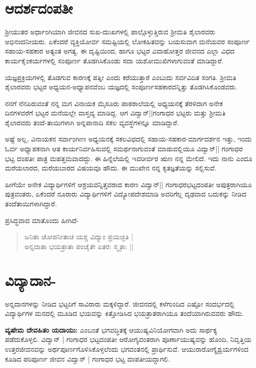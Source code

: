 \section*{ಆದರ್ಶದಂಪತೀ}

ಶ್ರೀಯುತರ ಅರ್ಧಾಂಗಿಯಾಗಿ ಜೀವನದ ಸುಖ-ದುಃಖಗಳಲ್ಲಿ ಪಾಲ್ಗೊಳ್ಳುತ್ತಿರುವ ಶ್ರೀಮತಿ ಶೈಲಾರವರು ಅಭಿನಂದನೀಯರು. ಏಕೆಂದರೆ ವ್ಯಕ್ತಿಯೋರ್ವ ಸಮಷ್ಟಿಯಲ್ಲಿ ಲೋಕಹಿತವನ್ನು ಬಯಸುವಾಗ ಮನೆಯವರ ಸಂಪೂರ್ಣ ಸಹಾಯ-ಸಹಕಾರ ಅತ್ಯಂತ ಅಗತ್ಯ. ಈ ದೃಷ್ಟಿಯಿಂದ, ಹಾಗೂ ಭಟ್ಟರ ವಿವಾಹೋತ್ತರ ಜೀವನದ ಎಲ್ಲಾ ವಿಧದ ಕಾರ್ಯಕೈಂಕರ್ಯಗಳಲ್ಲಿ ಸಂಪೂರ್ಣ ತೊಡಗಿಸಿಕೊಂಡು ಸದಾ ಯಶೋಮುಖಿಗಳಾಗುವಂತೆ ಮಾಡಿದ್ದಾರೆ. 

ಯಜ್ಞಪ್ರಕ್ರಿಯಗಳಲ್ಲಿ ತೊಡಗುವ ಕಾರಣಕ್ಕೆ ಪತ್ನೀ ಎಂದು ಕರೆಯುತ್ತಾರೆ ಎಂಬುದು ಸರ್ವವಿದಿತ ಸಂಗತಿ. ಶ್ರೀಮತಿ ಶೈಲಾರವರು ಭಟ್ಟರ ಅಧ್ಯಯನ-ಅಧ್ಯಾಪನವೆಂಬ ಯಜ್ಞದಲ್ಲಿ ಸಂಪೂರ್ಣಸಹಕಾರವನ್ನಿತ್ತು ತೊಡಗಿಸಿಕೊಂಡವರು. 									

ನನಗೆ ನೆನಪಿರುವಂತೆ ನನ್ನ ಮಗ ವಿನಾಯಕ ಮೈಸೂರು ಪಾಠಶಾಲೆಯಲ್ಲಿ ಅಧ್ಯಯನಕ್ಕೆ ತೆರಳಿದಾಗ ಅನೇಕ ದಿನಗಳವರೆಗೆ ಭಟ್ಟರ ಮನೆಯಲ್ಲೇ ವಾಸ್ತವ್ಯ ಮಾಡಿದ್ದ. ಆಗ ವಿದ್ವಾನ್||ಗಂಗಾಧರ ಭಟ್ಟರು ಮತ್ತು ಶ್ರೀಮತಿ ಶೈಲಾರವರು ತಂದೆ-ತಾಯಿಗಳಾಗಿ ಅನ್ನಪಾನಾದಿ ಸಕಲ ವ್ಯವಸ್ಥೆಗಳನ್ನೂ ಮಾಡಿದ್ದಾರೆ. 

ಅಷ್ಟೆ ಅಲ್ಲ, ವಿನಾಯಕನ ಸರ್ವಾಂಗೀಣ ಅಧ್ಯಯನಕ್ಕೆ ಸಕಲವಿಧದಲ್ಲಿ ಸಹಾಯ-ಸಹಕಾರ-ಮಾರ್ಗದರ್ಶನ ಇತ್ತು, ಇಂದು ಓರ್ವ ಅಧ್ಯಾಪಕನಾಗಿ ಆತ ಕಾರ್ಯನಿರ್ವಹಿಸುವಲ್ಲಿ ಸಮರ್ಥನಾಗುವಂತೆ ಮಾಡುವಲ್ಲಿಯೂ ವಿದ್ವಾನ್|| ಗಂಗಾಧರ ಭಟ್ಟ ದಂಪತೀ ಪಾತ್ರ ಮಹತ್ತಮವಾದದ್ದು. ಈ ಹಿನ್ನೆಲೆಯಲ್ಲಿ ಇವರೀರ್ವರ ಋಣ ನನ್ನ ಮೇಲಿದೆ. ಇದು ನಾನು ಎಂದೂ ಮರೆಯಲಾರದ, ಮರೆಯಬಾರದ ವಿಷಯವೂ ಹೌದು. ಈ ಮುಖೇನ ನನ್ನ ಕೃತಜ್ಞತೆಯನ್ನು ಸಲ್ಲಿಸುವೆ. 

ಹೀಗೆಯೇ ಅನೇಕ ವಿದ್ಯಾರ್ಥಿಗಳಿಗೆ ಆಶ್ರಯವನ್ನಿತ್ತವರಾದ ಕಾರಣ ವಿದ್ವಾನ್|| ಗಂಗಾಧರಭಟ್ಟದಂಪತೀ ಅಪುತ್ರರಾಗಿಯೂ ಪುತ್ರವಂತರು, ಏಕೆಂದರೆ ನೂರಾರು ವಿದ್ಯಾರ್ಥಿಗಳಿಗೆ ವಿದ್ಯೋಪದೇಶಮಾಡಿ ಅವರಿಗೆಲ್ಲ ದೃಢವಾದ ಬದುಕನ್ನು ನೀಡಿದ ತಂದೆತಾಯಿಗಳಾಗಿದ್ದಾರೆ. 					

ಪ್ರಸಿದ್ಧವಾದ ಮಾತೊಂದು ಹೀಗಿದೆ- 
\begin{verse}
ಜನಿತಾ ಚೋಪನೀತಾಚ ಯಶ್ಚ ವಿದ್ಯಾಂ ಪ್ರಯಚ್ಛತಿ |\\
ಅನ್ನದಾತಾ ಭಯತ್ರಾತಾ ಪಂಚೈತೇ ಪಿತರ: ಸ್ಮೃತಾ: || 		
\end{verse}

\section*{ವಿದ್ಯಾದಾನ-} 

ಅನ್ನದಾನಗಳನ್ನು ನೀಡಿದ ಭಟ್ಟರಿಗೆ ಸಾವಿರಾರು ಮಕ್ಕಳಿದ್ದಾರೆ. ಜೀವನದಲ್ಲಿ ಕಳೆಗುಂದಿದ ಎಷ್ಟೋ ಸಂದರ್ಭದಲ್ಲಿ ವಿದ್ಯಾರ್ಥಿಗಳ ಮನದಲ್ಲಿ ಮೂಡಿದ ಭಯವನ್ನು ಕಿತ್ತೋಡಿಸಿದ ಭಯತ್ರಾತರಾಗಿಯೂ ತಂದೆಯಾಗಿರುವವರು ಹೌದು.

\textbf{ವ್ಯಷೇಮ ದೇವಹಿತಂ ಯದಾಯು:} ಎಂಬಂತೆ ಭಗವದ್ಧಿತಕ್ಕೆ ಆಯುಷ್ಯವಿನಿಯೋಗವಾಗಿ ಅದು ಸಾರ್ಥಕ್ಯ ಪಡೆದುಕೊಳ್ಳಲಿ. ವಿದ್ವಾನ್ | ಗಂಗಾಧರ ಭಟ್ಟದಂಪತೀ ಆರೋಗ್ಯವಂತರಾಗಿ ಪೂರ್ಣಾಯುಷ್ಯವನ್ನು ಹೊಂದಿ, ನಿವೃತ್ತಿಯ ಉತ್ತರಜೀವನವನ್ನು ಅರ್ಥಪೂರ್ಣಗೊಳಿಸಿಕೊಳ್ಳಲೆಂದು ಭಗವಂತನಲ್ಲಿ ಪ್ರಾರ್ಥಿಸುವೆ. ಆಯುರಾರೋಗ್ಯೈಶ್ವರ್ಯಗಳಿಂದ ಕೂಡಿದ ಪರಿಪೂರ್ಣ ಜೀವನ ವಿದ್ವಾನ್ | ಗಂಗಾಧರ ಭಟ್ಟ ದಂಪತೀಯದ್ದಾಗಲಿ. 


